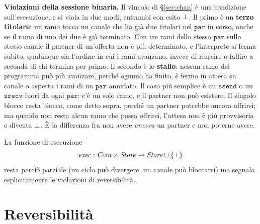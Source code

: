 \medskip
\noindent
\textbf{Violazioni della sessione binaria.} Il vincolo di \S\ref{sec:chan} è
una condizione sull'esecuzione, e si viola in due modi, entrambi con esito
$\bot$. Il primo è un \textbf{terzo titolare}: un ramo tocca un canale che ha
già due titolari nel $\mathtt{par}$ in corso, anche se il ramo di uno dei due è
già terminato. Con tre rami dello stesso $\mathtt{par}$ sullo stesso canale il
partner di un'offerta non è più determinato, e l'interprete si ferma subito,
qualunque sia l'ordine in cui i rami avanzano, invece di riuscire o fallire a
seconda di chi termina per primo.
Il secondo è lo \textbf{stallo}: nessun ramo del programma può più avanzare,
perché ognuno ha finito, è fermo in attesa su canale o aspetta i rami di un
$\mathtt{par}$ annidato. Il caso più semplice è un $\mathtt{ssend}$ o un
$\mathtt{srecv}$ fuori da ogni $\mathtt{par}$: c'è un solo ramo, e il partner
non può esistere. Il singolo blocco resta blocco, come detto sopra, perché un
partner potrebbe ancora offrirsi; ma quando non resta alcun ramo che possa
offrirsi, l'attesa non è più provvisoria e diventa $\bot$. È la differenza fra
non avere \emph{ancora} un partner e non poterne avere.

\medskip
\noindent
La funzione di esecuzione
\[
\mathit{exec} : \mathit{Com} \times \mathit{Store} \rightharpoonup \mathit{Store} \cup \{\bot\}
\]
resta perciò parziale (un ciclo può divergere, un canale può bloccarsi) ma
segnala esplicitamente le violazioni di reversibilità.

\chapter{Reversibilità}
\label{chap:reversibilita}
\label{sec:rev}

